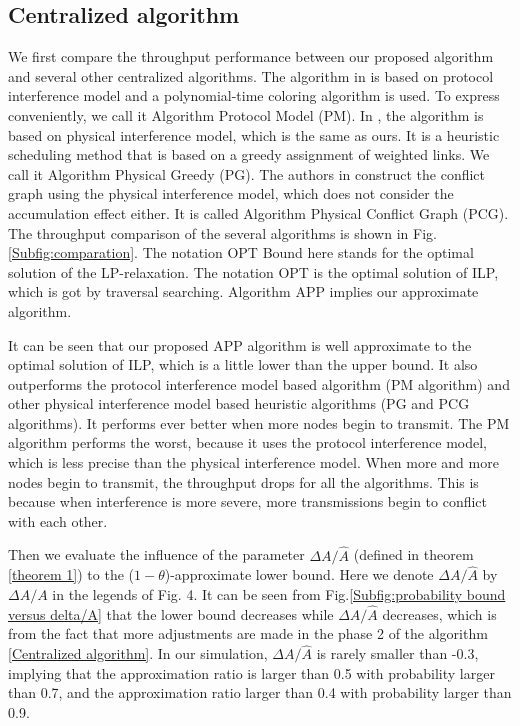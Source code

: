 \documentclass[conference]{IEEEtran}
\begin{document}
\subsection{Centralized algorithm}
We first compare the throughput performance between our proposed
algorithm and several other centralized algorithms. The algorithm in
\cite{ramanathan1993sam} is based on protocol interference model and
a polynomial-time coloring algorithm is used. To express
conveniently, we call it Algorithm Protocol Model (PM). In
\cite{brar2006ces}, the algorithm is based on physical interference
model, which is the same as ours. It is a heuristic scheduling
method that is based on a greedy assignment of weighted links. We
call it Algorithm Physical Greedy (PG). The authors in
\cite{behzad2007oil} construct the conflict graph using the physical
interference model, which does not consider the accumulation effect
either. It is called Algorithm Physical Conflict Graph (PCG). The
throughput comparison of the several algorithms is shown in
Fig.\ref{Subfig:comparation}. The notation OPT Bound here stands for
the optimal solution of the LP-relaxation. The notation OPT is the
optimal solution of ILP, which is got by traversal searching.
Algorithm APP implies our approximate algorithm.

It can be seen that our proposed APP algorithm is well approximate
to the optimal solution of ILP, which is a little lower than the
upper bound. It also outperforms the protocol interference model
based algorithm (PM algorithm) and other physical interference model
based heuristic algorithms (PG and PCG algorithms). It performs ever
better when more nodes begin to transmit. The PM algorithm performs
the worst, because it uses the protocol interference model, which is
less precise than the physical interference model. When more and
more nodes begin to transmit, the throughput drops for all the
algorithms. This is because when interference is more severe, more
transmissions begin to conflict with each other.

Then we evaluate the influence of the parameter $\Delta A /\hat{A}$
(defined in theorem \ref{theorem 1}) to the ($1-\theta$)-approximate
lower bound. Here we denote $\Delta A /\hat{A}$ by $\Delta A /A$ in
the legends of Fig. 4. It can be seen from
Fig.\ref{Subfig:probability bound versus delta/A} that the lower
bound decreases while $\Delta A /\hat{A}$ decreases, which is from
the fact that more adjustments are made in the phase 2 of the
algorithm \ref{Centralized algorithm}. In our simulation, $\Delta A
/\hat{A}$ is rarely smaller than -0.3, implying that the
approximation ratio is larger than 0.5 with probability larger than
0.7, and the approximation ratio larger than 0.4 with probability
larger than 0.9.
\end{document}
